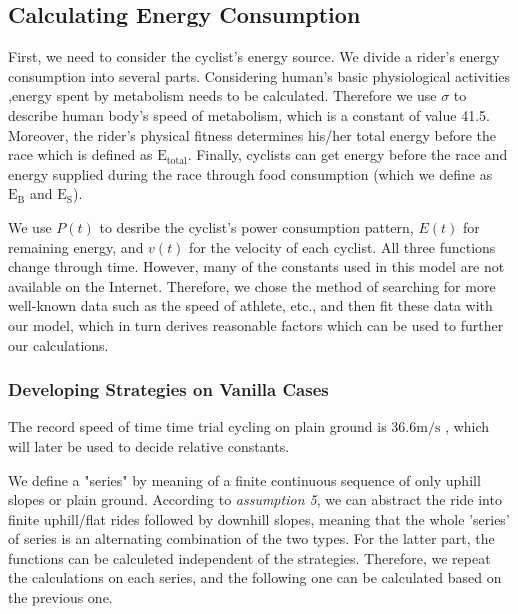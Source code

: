 \documentclass[14pt]{article}
\theoremstyle{definition}
\theoremstyle{remark}
\numberwithin{equation}{section}
\begin{document}
	\subsection{Calculating Energy Consumption}
	First, we need to consider the cyclist's energy source. We divide a rider's energy consumption into several parts. Considering human's basic physiological activities ,energy spent by metabolism needs to be calculated. Therefore we use $\sigma$ to describe human body's speed of metabolism, which is a constant of value 41.5. Moreover, the rider's physical fitness determines his/her total energy before the race which is defined as $\mathrm{E}_\mathrm{total}$. Finally, cyclists can get energy before the race and energy supplied during the race through food consumption (which we define as $\mathrm{E}_\mathrm{B}$ and $\mathrm{E}_\mathrm{S}$). 

	We use $P(t)$ to desribe the cyclist's power consumption pattern, $E(t)$ for remaining energy, and $v(t)$ for the velocity of each cyclist. All three functions change through time. However, many of the constants used in this model are not available on the Internet. Therefore, we chose the method of searching for more well-known data such as the speed of athlete, etc., and then fit these data with our model, which in turn derives reasonable factors which can be used to further our calculations.

	\subsubsection{Developing Strategies on Vanilla Cases}
	The record speed of time time trial cycling on plain ground is 36.6$\mathrm{m/s}$ \cite{time trial record}, which will later be used to decide relative constants.

	We define a "series" by meaning of a finite continuous sequence of only uphill slopes or plain ground. According to \textit{assumption 5}, we can abstract the ride into finite uphill/flat rides followed by downhill slopes, meaning that the whole 'series' of series is an alternating combination of the two types. For the latter part, the functions can be calculeted independent of the strategies. Therefore, we repeat the calculations on each series, and the following one can be calculated based on the previous one.
\end{document}
